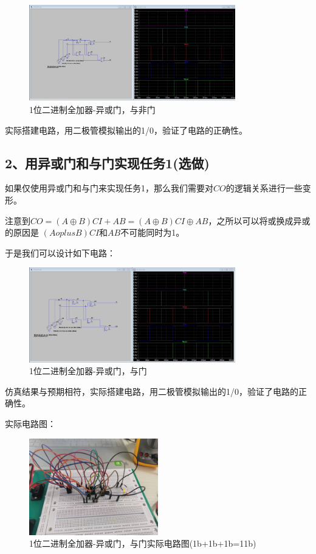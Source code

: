 \documentclass[UTF8]{ctexart}
\begin{document}
\begin{figure}[H]
    \centering
    \includegraphics[width = 0.8\textwidth]{1-1仿真.jpg}
    \caption{1位二进制全加器-异或门，与非门}
\end{figure}

实际搭建电路，用二极管模拟输出的1/0，验证了电路的正确性。

\subsection*{2、用异或门和与门实现任务1(选做)}

如果仅使用异或门和与门来实现任务1，那么我们需要对$CO$的逻辑关系进行一些变形。

注意到$CO = (A \oplus B)CI + AB = (A \oplus B)CI \oplus AB$，之所以可以将或换成异或的原因是
$(A oplus B)CI$和$AB$不可能同时为1。

于是我们可以设计如下电路：

\begin{figure}[H]
    \centering
    \includegraphics[width = 0.8\textwidth]{1-2仿真.jpg}
    \caption{1位二进制全加器-异或门，与门}
\end{figure}

仿真结果与预期相符，实际搭建电路，用二极管模拟输出的1/0，验证了电路的正确性。

实际电路图：
\begin{figure}[H]
    \centering
    \includegraphics[width = 0.5\textwidth]{1-2-r-1.jpg}
    \caption{1位二进制全加器-异或门，与门实际电路图(1b+1b+1b=11b)}
\end{figure}
\end{document}
